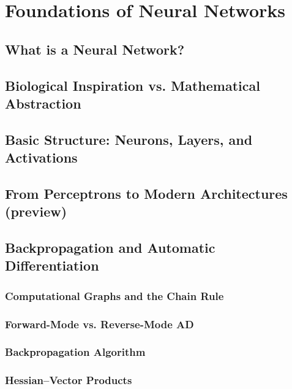 \chapter{Foundations of Neural Networks}
\section{What is a Neural Network?}
\section{Biological Inspiration vs. Mathematical Abstraction}
\section{Basic Structure: Neurons, Layers, and Activations}
\section{From Perceptrons to Modern Architectures (preview)}
\section{Backpropagation and Automatic Differentiation}

\subsection{Computational Graphs and the Chain Rule}

\subsection{Forward-Mode vs. Reverse-Mode AD}

\subsection{Backpropagation Algorithm}

\subsection{Hessian--Vector Products}
